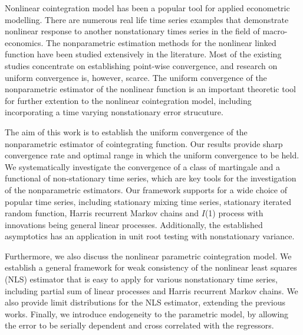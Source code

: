 


\begin{abstracts}        %
Nonlinear cointegration model has been a popular tool for applied econometric modelling. There are numerous real life time series examples that demonstrate nonlinear response to another nonstationary times series in the field of macro-economics. The nonparametric estimation methods for the nonlinear linked function have been studied extensively in the literature. Most of the existing studies concentrate on establishing point-wise convergence, and research on uniform convergence is, however, scarce. The uniform convergence of the nonparametric estimator of the nonlinear function is an important theoretic tool for further extention to the nonlinear cointegration model, including incorporating a time varying nonstationary error strucuture.

The aim of this work is to establish the uniform convergence of the nonparametric estimator of cointegrating function. Our results provide sharp convergence rate and  optimal range in which the uniform convergence to be held. We systematically investigate the convergence of a class of martingale and a functional of non-stationary time series, which are key tools for the investigation of the nonparametric estimators.  Our framework supports for a wide choice of popular time series, including stationary mixing time series, stationary iterated random function, Harris recurrent Markov chains and $I$(1) process with innovations being general linear processes. Additionally, the established asymptotics has an application in unit root testing with nonstationary variance.

Furthermore, we also discuss the nonlinear parametric cointegration model. We establish a general framework for weak consistency of the nonlinear least squares (NLS) estimator that is easy to apply for various nonstationary time series, including partial sum of linear processes and Harris recurrent Markov chains. We also provide limit distributions for the NLS estimator, extending the previous works. Finally, we introduce endogeneity to the parametric model, by allowing the error to be serially dependent and cross correlated with the regressors.


\end{abstracts}




